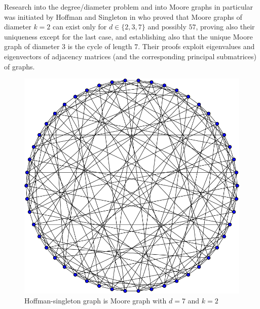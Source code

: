\documentclass[a4paper,12pt,oneside]{report}%
\begin{document}
Research into the degree/diameter problem and into Moore graphs in particular was initiated by Hoffman and Singleton in \cite{Hof-Sin} who proved that Moore graphs of diameter $k=2$ can exist only for $d\in \{2,3,7\}$ and possibly $57$, proving also their uniqueness except for the last case, and establishing also that the unique Moore graph of diameter $3$ is the cycle of length $7$. Their proofs exploit eigenvalues and eigenvectors of adjacency matrices (and the corresponding principal submatrices) of graphs.
\medskip

\begin{figure}[!ht]
	\centering
	\includegraphics[scale=0.33]{Hoffman-Singleton_graph.png}
	\caption{Hoffman-singleton graph is Moore graph with $d=7$ and $k=2$ }
\end{figure}


\end{document}
